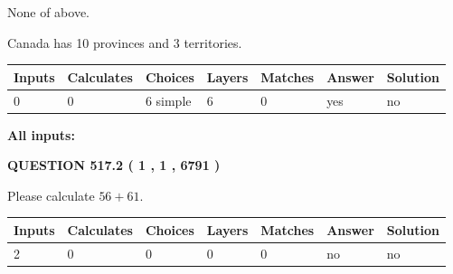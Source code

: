 \documentclass[12pt]{article}
\begin{document}
 
 None of above.
 
 
\noindent{}
 
 
Canada has 10  provinces and 3 territories.
 
 
\noindent{}
 
 
   
   
   
   
\noindent\begin{tabular}{|l|l|l|l|l|l|l|}
 \hline
Inputs & Calculates & Choices & Layers & Matches & Answer & Solution \\ \hline
 0  & 
 0  & 
 6
  simple  
  & 
 6  & 
 0  & 
  yes & 
  no 
  \\ \hline
 \end{tabular}
   
   
   
   
\noindent{}
   
   
   
   
\noindent\vspace{0.1in}\hspace{-0.08in} {\textbf{\Large{All inputs: }}}
   
   
  
\vspace{0.2in}
  
{\textbf{\Large{QUESTION
517.2 
 ( 1 , 1 , 6791 )
}}}
  
  
 
Please calculate $ %
56 +  %
61 $.
 
 
   
   
   
   
\noindent\begin{tabular}{|l|l|l|l|l|l|l|}
 \hline
Inputs & Calculates & Choices & Layers & Matches & Answer & Solution \\ \hline
 2  & 
 0  & 
 0
  & 
 0  & 
 0  & 
  no & 
  no 
  \\ \hline
 \end{tabular}
   
   
   
   
\noindent{}
   
\end{document}
